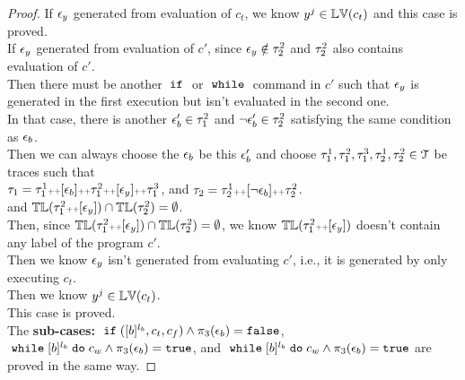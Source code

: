 \begin{proof}
If $\mathtt{\epsilon}_y$ generated from evaluation of $c_t$, we know $y^j \in \mathbb{LV}(c_t)$ and this case is proved.
\\
If $\mathtt{\epsilon}_y$ generated from evaluation of $c'$, since $\mathtt{\epsilon}_y \notin \mathtt{\tau}^2_2$ and $\mathtt{\tau}^2_2$ also contains evaluation of $c'$.
\\
Then there must be another $\;\mathtt{if}\;$ or $\;\mathtt{while}\;$ command in $c'$ such that $\mathtt{\epsilon}_y$ is generated in the first execution 
but isn't evaluated in the second one.
\\
In that case, there is another $\mathtt{\epsilon}_b' \in \mathtt{\tau}_1^2$ and $\neg\mathtt{\epsilon}_b' \in \mathtt{\tau}^2_2$ satisfying the same condition as $\mathtt{\epsilon}_b$.
\\
Then we can always choose the $\mathtt{\epsilon}_b$ be this $\mathtt{\epsilon}_b'$ and choose $\mathtt{\tau}_1^1, \mathtt{\tau}_1^2, \mathtt{\tau}_1^3, \mathtt{\tau}_2^1, \mathtt{\tau}_2^2 \in \mathcal{T}$ be traces
such that 
\\
$\mathtt{\tau}_1 = \mathtt{\tau}_1^1 {\scriptscriptstyle ++} [\mathtt{\epsilon}_b] {\scriptscriptstyle ++}  \mathtt{\tau}_1^2 {\scriptscriptstyle ++} [\mathtt{\epsilon}_y] {\scriptscriptstyle ++} \mathtt{\tau}_1^3$,
and $\mathtt{\tau}_2 = \mathtt{\tau}^1_2 {\scriptscriptstyle ++} [\neg\mathtt{\epsilon}_b] {\scriptscriptstyle ++}  \mathtt{\tau}^2_2$.
\\
and $\mathbb{TL}(\mathtt{\tau}_1^2 {\scriptscriptstyle ++} [\mathtt{\epsilon}_y]) \cap \mathbb{TL}(\mathtt{\tau}^2_2) = \emptyset$.
\\
Then, since $\mathbb{TL}(\mathtt{\tau}_1^2 {\scriptscriptstyle ++} [\mathtt{\epsilon}_y]) \cap \mathbb{TL}(\mathtt{\tau}^2_2) = \emptyset$, 
we know $\mathbb{TL}(\mathtt{\tau}_1^2 {\scriptscriptstyle ++} [\mathtt{\epsilon}_y])$ doesn't contain any 
label of the program $c'$.
\\
Then we know $\mathtt{\epsilon}_y$ isn't generated from evaluating $c'$, i.e., it is generated 
by only executing $c_t$.
\\
Then we know $y^j \in \mathbb{LV}(c_t)$.
\\
This case is proved.
\\
The \textbf{sub-cases:} 
{$\;\mathtt{if}\; ([b]^{l_b}, c_t, c_f) \land \pi_3(\mathtt{\epsilon}_b) = \mathtt{false}$},
$\;\mathtt{while}\; [b]^{l_b} \;\mathtt{do}\; c_w\land \pi_3(\mathtt{\epsilon}_b) = \mathtt{true}$, 
and $\;\mathtt{while}\; [b]^{l_b} \;\mathtt{do}\; c_w \land \pi_3(\mathtt{\epsilon}_b) = \mathtt{true}$ 
are proved in the same way.

\end{proof}

